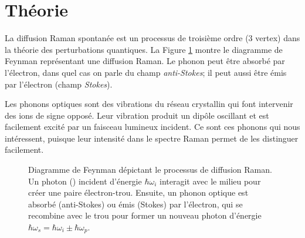 \documentclass[10pt,letterpaper,twocolumn]{article}
\begin{document}
\section{Théorie}\label{sec:theorie} %
La diffusion Raman spontanée est un processus de troisième ordre (3 vertex) dans la théorie des perturbations quantiques\supercite{Yu2010extension}. La Figure \ref{fig:FeynmanD} montre le diagramme de Feynman représentant une diffusion Raman. Le phonon peut être absorbé par l'électron, dans quel cas on parle du champ \textit{anti-Stokes}; il peut aussi être émis par l'électron (champ \textit{Stokes}). \par
Les phonons optiques sont des vibrations du réseau crystallin qui font intervenir des ions de signe opposé. Leur vibration produit un dipôle oscillant et est facilement excité par un faisceau lumineux incident. Ce sont ces phonons qui nous intéressent, puisque leur intensité dans le spectre Raman permet de les distinguer facilement. 

\begin{figure}[H]
	\centering
	\caption{Diagramme de Feynman dépictant le processus de diffusion Raman. Un photon (\leadsto) incident d'énergie $\hbar \omega_i$ interagit avec le milieu pour créer une paire électron-trou. Ensuite, un phonon optique est absorbé (anti-Stokes) ou émis (Stokes) par l'électron, qui se recombine avec le trou pour former un nouveau photon d'énergie $\hbar \omega_s = \hbar \omega_i \pm \hbar \omega_p$. }
	\label{fig:FeynmanD}
\end{figure}
\end{document}
